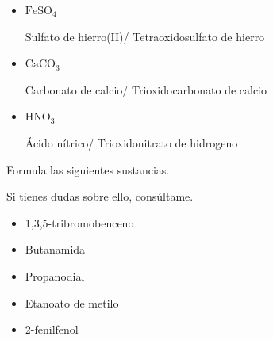 \documentclass[answers,addpoints,14pt]{exam}
\newcommand*\chem[1]{\ensuremath{\mathrm{#1}}}
\begin{document}
\begin{questions}
\begin{question}[4]
\begin{itemize}
		\item $\chem{FeSO_4}$
		\begin{mdframed}[backgroundcolor=brown!10]  
		Sulfato de hierro(II)/ Tetraoxidosulfato de hierro
		\end{mdframed}
		
		\item $\chem{CaCO_3}$
		\begin{mdframed}[backgroundcolor=brown!10]  
		Carbonato de calcio/ Trioxidocarbonato de calcio
		\end{mdframed}
		\item $\chem{HNO_3}$
		\begin{mdframed}[backgroundcolor=brown!10]  
		Ácido nítrico/ Trioxidonitrato de hidrogeno
		\end{mdframed}
	
	\end{itemize}
\end{question}



\begin{question}[4] Formula las siguientes sustancias. 

\begin{mdframed}[backgroundcolor=brown!10]  
Si tienes dudas sobre ello, consúltame.
\end{mdframed}
		\begin{itemize}
		\item 1,3,5-tribromobenceno%
		
		\item Butanamida%
		
		\item Propanodial%
		
		\item Etanoato de metilo%
		
		\item 2-fenilfenol%
				

\end{itemize}
\end{question}
\end{questions}
\end{document}
